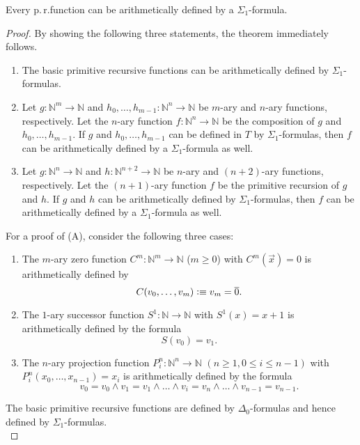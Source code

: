 \begin{thm}\label{thm:arithmeticallydefined}
Every p.\,r.\@ function can be arithmetically defined by a $\Sigma_1$-formula.
\end{thm}
\begin{proof}
By showing the following three statements, the theorem immediately follows.

\begin{enumerate}[label=\Alph*]
\item The basic primitive recursive functions can be arithmetically defined by $\Sigma_1$-formulas.
\item Let $g : \mathbb{N}^m \rightarrow \mathbb{N}$ and $h_0, \ldots, h_{m-1} : \mathbb{N}^n \rightarrow \mathbb{N}$ be $m$-ary and $n$-ary functions, respectively. Let the $n$-ary function $f: \mathbb{N}^n \rightarrow \mathbb{N}$ be the composition of $g$ and $h_0, \ldots, h_{m-1}$. If $g$ and $h_0, \ldots, h_{m-1}$ can be defined in $T$ by $\Sigma_1$-formulas, then $f$ can be arithmetically defined by a $\Sigma_1$-formula as well.
\item Let $g : \mathbb{N}^n \rightarrow \mathbb{N}$ and $h : \mathbb{N}^{n+2} \rightarrow \mathbb{N}$ be $n$-ary and $(n+2)$-ary functions, respectively. Let the $(n+1)$-ary function $f$ be the primitive recursion of $g$ and $h$. If $g$ and $h$ can be arithmetically defined by $\Sigma_1$-formulas, then $f$ can be arithmetically defined by a $\Sigma_1$-formula as well.
\end{enumerate}

For a proof of (A), consider the following three cases:
\begin{enumerate}
\item The $m$-ary zero function $C^m: \mathbb{N}^m \rightarrow \mathbb{N}$ ($m \ge 0$) with $C^m(\overrightarrow{x}) = 0$ is arithmetically defined by \[C(v_0, \ldots, v_{m}) \vcentcolon \equiv v_{m} = \overline{0}.\] 
\item The $1$-ary successor function $S^1: \mathbb{N} \rightarrow \mathbb{N}$ with $S^1(x) = x + 1$ is arithmetically defined by the formula \[S(v_0)=v_1.\]
\item The $n$-ary projection function $P_i^n:\mathbb{N}^n \rightarrow \mathbb{N}$ $(n \ge 1, 0 \le i \le n-1)$ with $P_i^n(x_0,\ldots, x_{n-1}) = x_i $ is arithmetically defined by the formula \[v_0 = v_0  \wedge  v_{1} = v_{1}  \wedge  \ldots  \wedge  v_{i} = v_{n}  \wedge  \ldots  \wedge  v_{n-1} = v_{n-1}.\]
\end{enumerate}
The basic primitive recursive functions are defined by $\Delta_0$-formulas and hence defined by $\Sigma_1$-formulas.
\\


\end{proof}
